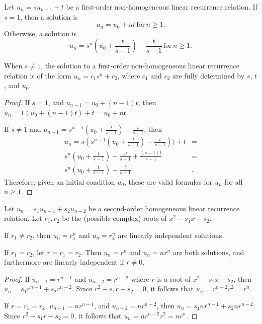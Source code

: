 \begin{thm}
    Let $u_n = su_{n-1} + t$ be a first-order non-homogeneous linear recurrence relation. If $s = 1$, then a solution is \[u_n = u_0 + nt \,\textrm{for}\, n \geq 1.\] Otherwise, a solution is \[u_n = s^n(u_0 + \frac{t}{s-1}) - \frac{t}{s-1} \,\textrm{for}\, n \geq 1.\]
\end{thm}

\begin{rmk}
    When $s \neq 1$, the solution to a first-order non-homogeneous linear recurrence relation is of the form $u_n = c_1s^n + c_2$, where $c_1$ and $c_2$ are fully determined by $s$, $t$, and $u_0$.
\end{rmk}

\begin{proof}\proofbreak
    If $s = 1$, and $u_{n-1} = u_0 + (n-1)t$, then $u_n = 1(u_0 + (n-1)t) + t = u_0 + nt$.

    If $s \neq 1$ and $u_{n-1} = s^{n-1}(u_0 + \frac{t}{s-1}) - \frac{t}{s-1}$, then
    \begin{align*}
        u_n = s(s^{n-1}(u_0 + \frac{t}{s-1}) - \frac{t}{s-1})) + t & = \\
        s^n(u_0 + \frac{t}{s-1}) - \frac{st}{s-1} + \frac{(s-1)t}{s-1} & = \\
        s^n(u_0 + \frac{t}{s-1}) - \frac{t}{s-1} &.
    \end{align*}
    Therefore, given an initial condition $u_0$, these are valid formulas for $u_n$ for all $n \geq 1$.
\end{proof}

\begin{thm}
    Let $u_n = s_1u_{n-1} + s_2u_{n-2}$ be a second-order homogeneous linear recurrence relation. Let $r_1, r_2$ be the (possible complex) roots of $x^2 - s_1x - s_2$.

    If $r_1 \neq r_2$, then $u_n = r_1^n$ and $u_n = r_2^n$ are linearly independent solutions.

    If $r_1 = r_2$, let $r = r_1 = r_2$. Then $u_n = r^n$ and $u_n = nr^n$ are both solutions, and furthermore are linearly independent if $r \neq 0$.
\end{thm}

\begin{proof}\proofbreak
    If $u_{n-1} = r^{n-1}$ and $u_{n-2} = r^{n-2}$ where $r$ is a root of $x^2 - s_1x - s_2$, then $u_n = s_1r^{n-1} + s_2r^{n-2}$. Since $r^2 - s_1r - s_2 = 0$, it follows that $u_n = r^{n-2}r^2 = r^n$.

    If $r = r_1 = r_2$, $u_{n-1} = nr^{n-1}$, and $u_{n-2} = nr^{n-2}$, then $u_n = s_1nr^{n-1} + s_2nr^{n-2}$. Since $r^2 - s_1r - s_2 = 0$, it follows that $u_n = nr^{n-2}r^2 = nr^n$.
\end{proof}

